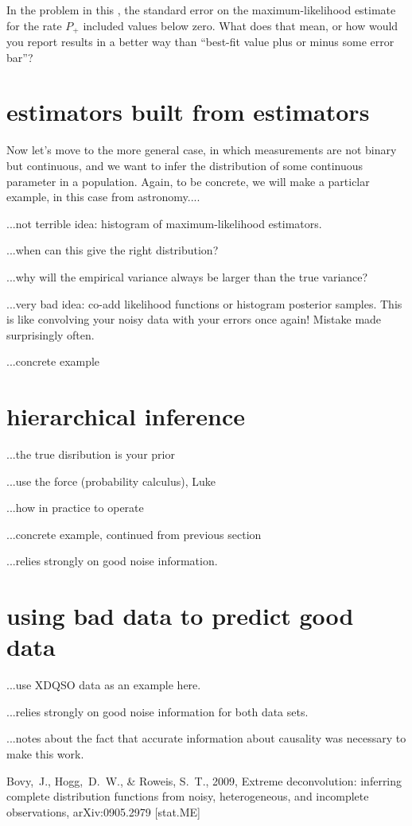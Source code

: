 \documentclass[12pt,twoside]{article}
\begin{document}
\begin{problem}
In the problem in this \sectionname, the standard error on the
maximum-likelihood estimate for the rate $P_+$ included
values below zero.  What does that mean, or how would you report
results in a better way than ``best-fit value plus or minus some error
bar''?
\end{problem}

\section{estimators built from estimators}

Now let's move to the more general case, in which measurements are not
binary but continuous, and we want to infer the distribution of some
continuous parameter in a population.  Again, to be concrete, we will
make a particlar example, in this case from astronomy....

...not terrible idea: histogram of maximum-likelihood estimators.

...when can this give the right distribution?

...why will the empirical variance always be larger than the true variance?

...very bad idea: co-add likelihood functions or histogram posterior
samples.  This is like convolving your noisy data with your errors
once again!  Mistake made surprisingly often.

...concrete example

\section{hierarchical inference}

...the true disribution is your prior

...use the force (probability calculus), Luke

...how in practice to operate

...concrete example, continued from previous section

...relies strongly on good noise information.

\section{using bad data to predict good data}

...use XDQSO data as an example here.

...relies strongly on good noise information for both data sets.

...notes about the fact that accurate information about causality was
necessary to make this work.

\clearpage
{}\theendnotes

\clearpage
\begin{thebibliography}{}
  Bovy,~J., Hogg,~D.~W., \& Roweis, S.~T., 2009,
  Extreme deconvolution: inferring complete distribution functions from noisy, heterogeneous, and incomplete observations, 
  arXiv:0905.2979 [stat.ME]
\end{thebibliography}
\end{document}
